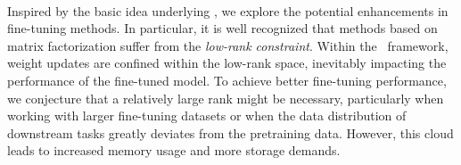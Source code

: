 

\paragraph{\loha\afterhead}
Inspired by the basic idea underlying \lora, we explore the potential enhancements in fine-tuning methods. In particular, it is well recognized that methods based on matrix factorization suffer from the \emph{low-rank constraint}. Within the \lora~framework, weight updates are confined within the low-rank space, inevitably impacting the performance of the fine-tuned model. To achieve better fine-tuning performance, we conjecture that a relatively large rank might be necessary, particularly when working with larger fine-tuning datasets or when the data distribution of downstream tasks greatly deviates from the pretraining data. However, this cloud leads to increased memory usage and more storage demands.

